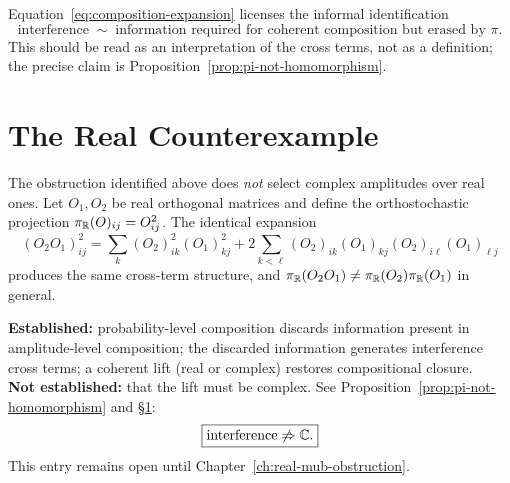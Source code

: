 \begin{remark}
Equation~\eqref{eq:composition-expansion} licenses the informal identification
\[
\text{interference} \;\sim\; \text{information required for coherent composition
but erased by } \pi.
\]
This should be read as an interpretation of the cross terms, not as a
definition; the precise claim is Proposition~\ref{prop:pi-not-homomorphism}.
\end{remark}

\section{The Real Counterexample}
\label{sec:real-counterexample}

The obstruction identified above does \emph{not} select complex amplitudes over
real ones. Let $O_1, O_2$ be real orthogonal matrices and define the
orthostochastic projection $\pi_{\mathbb{R}}(O)_{ij} = O_{ij}^2$. The identical expansion
\begin{equation}
(O_2 O_1)_{ij}^2
= \sum_k (O_2)_{ik}^2 (O_1)_{kj}^2
+ 2\sum_{k < \ell} (O_2)_{ik}(O_1)_{kj}(O_2)_{i\ell}(O_1)_{\ell j}
\end{equation}
produces the same cross-term structure, and $\pi_{\mathbb{R}}(O_2 O_1) \neq \pi_{\mathbb{R}}(O_2)\pi_{\mathbb{R}}(O_1)$
in general.

\begin{ledgerentry}
\textbf{Established:} probability-level composition discards information present
in amplitude-level composition; the discarded information generates interference
cross terms; a coherent lift (real or complex) restores compositional closure.\\
\textbf{Not established:} that the lift must be complex. See
Proposition~\ref{prop:pi-not-homomorphism} and \S\ref{sec:real-counterexample}:
\[
\boxed{\text{interference} \not\Rightarrow \mathbb{C}.}
\]
This entry remains open until Chapter~\ref{ch:real-mub-obstruction}.
\end{ledgerentry}
